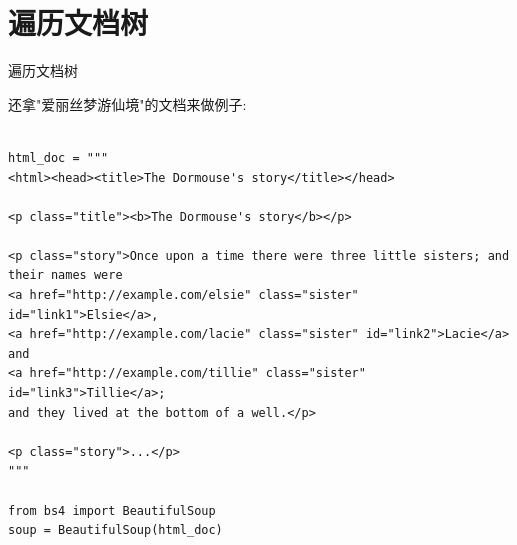 \documentclass{beamer}
\begin{document}
% 
% 
% 
% 
% 
% 
% 
% 
% 
% 
% 
% 
% 
% 
% 
% 
% 
% 
% 
% 
% 
% 
% 
\section{遍历文档树}


\begin{frame}[t,fragile]{遍历文档树}

还拿"爱丽丝梦游仙境"的文档来做例子:

\tiny
\begin{verbatim}

html_doc = """
<html><head><title>The Dormouse's story</title></head>

<p class="title"><b>The Dormouse's story</b></p>

<p class="story">Once upon a time there were three little sisters; and their names were
<a href="http://example.com/elsie" class="sister" id="link1">Elsie</a>,
<a href="http://example.com/lacie" class="sister" id="link2">Lacie</a> and
<a href="http://example.com/tillie" class="sister" id="link3">Tillie</a>;
and they lived at the bottom of a well.</p>

<p class="story">...</p>
"""

from bs4 import BeautifulSoup
soup = BeautifulSoup(html_doc)


\end{verbatim}


\end{frame}
\end{document}
